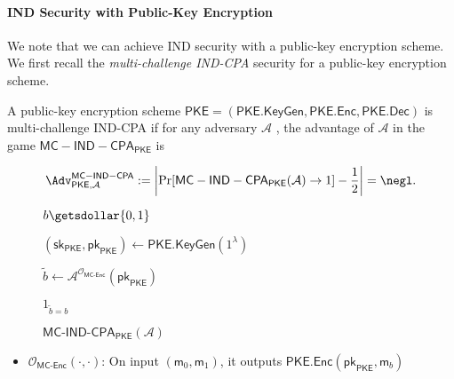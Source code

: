 \paragraph{IND Security with Public-Key Encryption}

We note that we can achieve IND security with a public-key encryption scheme. We first recall the \emph{multi-challenge IND-CPA} security for a public-key encryption scheme.

\begin{definition}

A public-key encryption scheme $\mathsf{PKE} = (\mathsf{PKE.KeyGen}, \mathsf{PKE.Enc}, \mathsf{PKE.Dec})$ is multi-challenge IND-CPA if for any adversary $\mathcal{A}$ , the advantage of $\mathcal{A}$ in the game $\mathsf{MC-IND-CPA}_{\mathsf{PKE}}$ is

\[
	\Adv^{\mathsf{MC-IND-CPA}}_{\mathsf{PKE}, \mathcal{A}} := \left| \Pr[ \mathsf{MC-IND-CPA}_{\mathsf{PKE}}(\mathcal{A}) \to 1 ] - \frac{1}{2} \right| = \negl.
\]

\begin{figure}[h]
\centering

	\begin{minipage}[t]{0.6\textwidth}
	\begin{algorithm}[H]
	\caption{$\textsf{MC-IND-CPA}_{\mathsf{PKE}} (\mathcal{A})$ }
	\label{alg:MC-IND-CPA}
	\begin{algorithmic}[1]
		\State $b \getsdollar \{0, 1\}$

		\State $(\mathsf{sk}_{\mathsf{PKE}}, \mathsf{pk}_{\mathsf{PKE}}) \gets \mathsf{PKE.KeyGen}(1^\lambda)$
		
		\State $\tilde{b} \gets \mathcal{A}^{\mathcal{O}_{\textsf{MC-Enc}}}(\mathsf{pk}_{\mathsf{PKE}})$ 
		
		\State \Return $1_{\tilde{b} = b}$
	\end{algorithmic}
	\end{algorithm}
	\end{minipage}

\end{figure}
\end{definition}

\begin{itemize}
	\item $\mathcal{O}_{\textsf{MC-Enc}}(\cdot, \cdot)$: On input $(\mathsf{m}_0, \mathsf{m}_1)$, it outputs $\mathsf{PKE.Enc}(\mathsf{pk}_{\mathsf{PKE}}, \mathsf{m}_b)$
\end{itemize}

